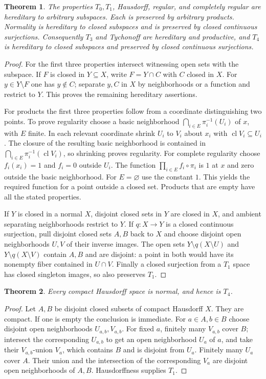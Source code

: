 \documentclass[11pt,oneside,openany]{book}
\newtheorem{theorem}{Theorem}[chapter]
\theoremstyle{definition}
\theoremstyle{remark}
\DeclareMathOperator{\cl}{cl}
\begin{document}
\begin{theorem}\label{d10:07:heredity-products}
The properties $T_0,T_1$, Hausdorff, regular, and completely regular are hereditary to arbitrary subspaces. Each is preserved by arbitrary products. Normality is hereditary to closed subspaces and is preserved by closed continuous surjections. Consequently $T_3$ and Tychonoff are hereditary and productive, and $T_4$ is hereditary to closed subspaces and preserved by closed continuous surjections.
\end{theorem}
\begin{proof}
For the first three properties intersect witnessing open sets with the subspace. If $F$ is closed in $Y\subseteq X$, write $F=Y\cap C$ with $C$ closed in $X$. For $y\in Y\setminus F$ one has $y\notin C$; separate $y,C$ in $X$ by neighborhoods or a function and restrict to $Y$. This proves the remaining hereditary assertions.

For products the first three properties follow from a coordinate distinguishing two points. To prove regularity choose a basic neighborhood $\bigcap_{i\in E}\pi_i^{-1}(U_i)$ of $x$, with $E$ finite. In each relevant coordinate shrink $U_i$ to $V_i$ about $x_i$ with $\cl V_i\subseteq U_i$. The closure of the resulting basic neighborhood is contained in $\bigcap_{i\in E}\pi_i^{-1}(\cl V_i)$, so shrinking proves regularity. For complete regularity choose $f_i(x_i)=1$ and $f_i=0$ outside $U_i$. The function $\prod_{i\in E}f_i\circ\pi_i$ is $1$ at $x$ and zero outside the basic neighborhood. For $E=\varnothing$ use the constant $1$. This yields the required function for a point outside a closed set. Products that are empty have all the stated properties.

If $Y$ is closed in a normal $X$, disjoint closed sets in $Y$ are closed in $X$, and ambient separating neighborhoods restrict to $Y$. If $q:X\to Y$ is a closed continuous surjection, pull disjoint closed sets $A,B$ back to $X$ and choose disjoint open neighborhoods $U,V$ of their inverse images. The open sets $Y\setminus q(X\setminus U)$ and $Y\setminus q(X\setminus V)$ contain $A,B$ and are disjoint: a point in both would have its nonempty fiber contained in $U\cap V$. Finally a closed surjection from a $T_1$ space has closed singleton images, so also preserves $T_1$.
\end{proof}

\begin{theorem}\label{d10:07:compact-normal}
Every compact Hausdorff space is normal, and hence is $T_4$.
\end{theorem}
\begin{proof}
Let $A,B$ be disjoint closed subsets of compact Hausdorff $X$. They are compact. If one is empty the conclusion is immediate. For $a\in A,b\in B$ choose disjoint open neighborhoods $U_{a,b},V_{a,b}$. For fixed $a$, finitely many $V_{a,b}$ cover $B$; intersect the corresponding $U_{a,b}$ to get an open neighborhood $U_a$ of $a$, and take their $V_{a,b}$-union $V_a$, which contains $B$ and is disjoint from $U_a$. Finitely many $U_a$ cover $A$. Their union and the intersection of the corresponding $V_a$ are disjoint open neighborhoods of $A,B$. Hausdorffness supplies $T_1$.
\end{proof}
\end{document}
